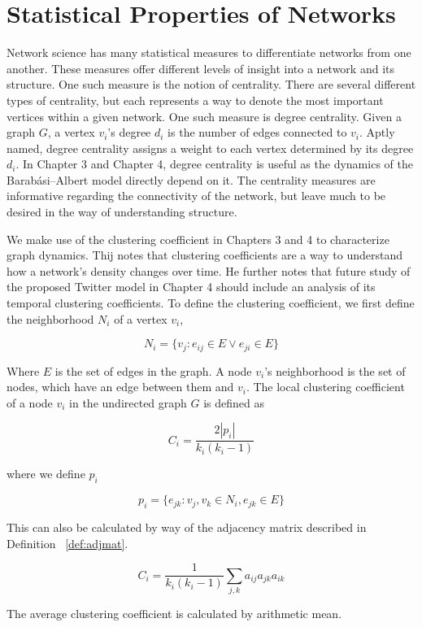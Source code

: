 \section{Statistical Properties of Networks}
\label{section: Statistical Properties of Networks}
Network science has many statistical measures to differentiate networks from one another. These
measures offer different levels of insight into a network and its structure.
One such measure is the notion of centrality. There are several different types
of centrality, but each represents a way to denote the most important vertices within a 
given network. One such measure is degree centrality. Given a graph $G$, a vertex $v_i$'s
degree $d_i$ is the number of edges connected to $v_i$.
Aptly named, degree centrality 
assigns a weight to each vertex determined by its degree $d_i$. In Chapter 3 and Chapter 4, degree
centrality is useful as the dynamics of the Barabási–Albert model directly depend on it. The centrality 
measures are informative regarding the connectivity of the network, but leave much to be desired in the way 
of understanding structure.

We make use of the clustering coefficient in Chapters 3 and 4 to characterize graph dynamics. Thij \cite{thij}
notes that clustering coefficients are a way to understand how a network's density changes over time. He 
further notes that future study of the proposed Twitter model in Chapter 4 should include an analysis of its temporal clustering coefficients.
To define the clustering coefficient, we first define the neighborhood $N_i$ of a vertex $v_i$,

$$
N_i = \{v_j: e_{ij}\in E \lor e_{ji} \in E\}
$$

\noindent Where $E$ is the set of edges in the graph. A node $v_i$'s neighborhood is  
the set of nodes, which have an edge between them and $v_i$. The local clustering coefficient of a node $v_i$ in the undirected graph $G$ is defined as 

$$
C_i = \frac{2|p_i|}{k_i(k_i-1)}
$$

\noindent where we define $p_i$

$$
p_i = \{ e_{jk}: v_j, v_k \in N_i, e_{jk}\in E\}
$$

\noindent This can also be calculated by way of the adjacency matrix described in Definition ~\ref{def:adjmat}.

$$
C_i =\frac{1}{k_i(k_i-1)} \sum_{j,k} a_{ij}a_{jk}a_{ik}
$$

\noindent The average clustering coefficient is calculated by arithmetic mean.

